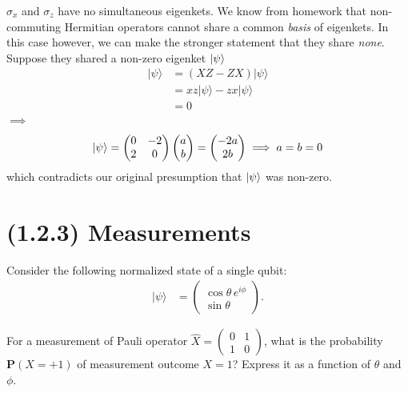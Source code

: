 \documentclass[11pt, answers]{exam}
\newcommand{\prob}{\textbf{P}}
\begin{document}
	\begin{solution}
		$\sigma_x$ and $\sigma_z$ have no simultaneous eigenkets. We know from homework that non-commuting Hermitian operators cannot share a common \textit{basis} of eigenkets. In this case however, we can make the stronger statement that they share \textit{none}. Suppose they shared a non-zero eigenket $\ket{\psi}$
		\begin{align*}
			[X,Z]|\psi\rangle
			&=(XZ-ZX)|\psi\rangle\\
			&=xz|\psi\rangle-zx|\psi\rangle\\
			&=0
		\end{align*}
		$\implies$
		\begin{align*}
			[X,Z]\ket{\psi}=\begin{pmatrix}0&-2\\2&0\end{pmatrix}
			\begin{pmatrix}
				a \\
				b
			\end{pmatrix}
			=
			\begin{pmatrix}
				-2a \\
				2b
			\end{pmatrix}
			\implies a = b = 0
		\end{align*}
		which contradicts our original presumption that $\ket{\psi}$ was non-zero.
	\end{solution}
	
	\section*{(1.2.3) Measurements}
	
	Consider the following normalized state of a single qubit:
	\begin{align*}
		|\psi\rangle
		&= \begin{pmatrix}
			\cos\theta\,e^{i\phi} \\
			\sin\theta
		\end{pmatrix}.
		\tag{1.3}
	\end{align*}
	
	\noindent For a measurement of Pauli operator
	$\hat{X}=\begin{pmatrix}0 & 1 \\ 1 & 0\end{pmatrix}$,
	what is the probability $\prob(X=+1)$ of measurement outcome $X=1$?
	Express it as a function of $\theta$ and $\phi$.
	
\end{document}
